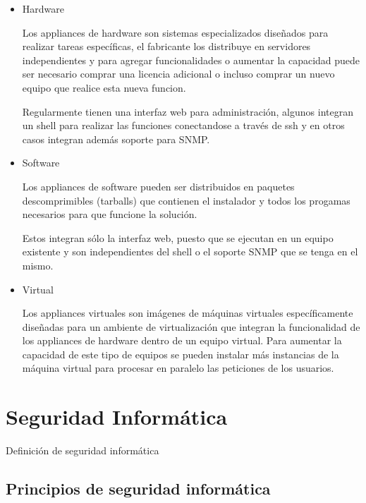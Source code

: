 \begin{itemize}

  \item Hardware
  
Los appliances de hardware son sistemas especializados dise\~{n}ados para realizar tareas espec\'{i}ficas, el fabricante los distribuye en servidores independientes y para agregar funcionalidades o aumentar la capacidad puede ser necesario comprar una licencia adicional o incluso comprar un nuevo equipo que realice esta nueva funcion.

Regularmente tienen una interfaz web para administraci\'{o}n, algunos integran un shell para realizar las funciones conectandose a trav\'{e}s de ssh y en otros casos integran adem\'{a}s soporte para SNMP.
\cite{dcd32ad713054f2f67fbcd17c0900928}

  \item Software
  
Los appliances de software pueden ser distribuidos en paquetes descomprimibles (tarballs) que contienen el instalador y todos los progamas necesarios para que funcione la soluci\'{o}n.

Estos integran s\'{o}lo la interfaz web, puesto que se ejecutan en un equipo existente y son independientes del shell o el soporte SNMP que se tenga en el mismo.
\cite{bitnami}
\cite{4cb5bff4c029d86b328a2126e8a3060f}
  
  \item Virtual 

Los appliances virtuales son im\'{a}genes de m\'{a}quinas virtuales espec\'{i}ficamente dise\~{n}adas para un ambiente de virtualizaci\'{o}n que integran la funcionalidad de los appliances de hardware dentro de un equipo virtual. Para aumentar la capacidad de este tipo de equipos se pueden instalar m\'{a}s instancias de la m\'{a}quina virtual para procesar en paralelo las peticiones de los usuarios.
\cite{314f38cbb73bf967a21191775959cf1d}
  
\end{itemize}

\section {Seguridad Inform\'{a}tica}
    
Definici\'{o}n de seguridad inform\'{a}tica

  \subsection {Principios de seguridad inform\'{a}tica}

